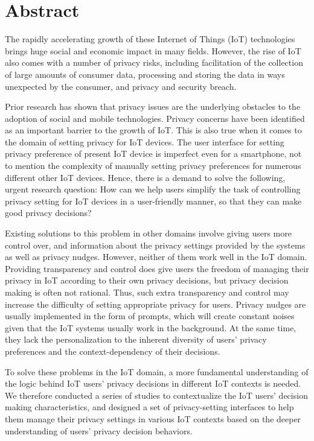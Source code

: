 \chapter*{Abstract}
The rapidly accelerating growth of these Internet of Things (IoT) technologies brings huge social and economic impact in many fields. However, the rise of IoT also comes with a number of privacy risks, including facilitation of the collection of large amounts of consumer data, processing and storing the data in ways unexpected by the consumer, and privacy and security breach.

Prior research has shown that privacy issues are the underlying obstacles to the adoption of social and mobile technologies. Privacy concerns have been identified as an important barrier to the growth of IoT. This is also true when it comes to the domain of setting privacy for IoT devices. The user interface for setting privacy preference of present IoT device is imperfect even for a smartphone, not to mention the complexity of manually setting privacy preferences for numerous different other IoT devices. Hence, there is a demand to solve the following, urgent research question: How can we help users simplify the task of controlling privacy setting for IoT devices in a user-friendly manner, so that they can make good privacy decisions?

Existing solutions to this problem in other domains involve giving users more control over, and information about the privacy settings provided by the systems as well as privacy nudges. However, neither of them work well in the IoT domain. Providing transparency and control does give users the freedom of managing their privacy in IoT according to their own privacy decisions, but privacy decision making is often not rational. Thus, such extra transparency and control may increase the difficulty of setting appropriate privacy for users. Privacy nudges are usually implemented in the form of prompts, which will create constant noises given that the IoT systems usually work in the background. At the same time, they lack the personalization to the inherent diversity of users’ privacy preferences and the context-dependency of their decisions.

To solve these problems in the IoT domain, a more fundamental understanding of the logic behind IoT users' privacy decisions in different IoT contexts is needed. We therefore conducted a series of studies to contextualize the IoT users' decision making characteristics, and designed a set of privacy-setting interfaces to help them manage their privacy settings in various IoT contexts based on the deeper understanding of users' privacy decision behaviors. 

